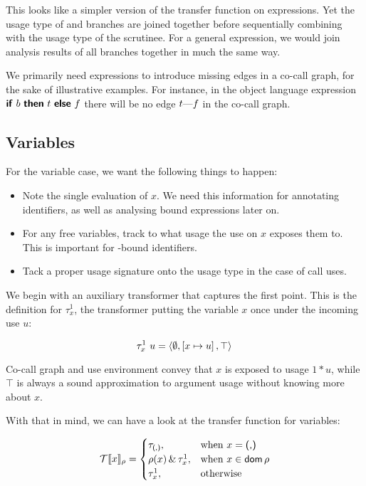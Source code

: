 This looks like a simpler version of the transfer function on  expressions.
Yet the usage type of  and  branches are joined together before sequentially combining with the usage type of the scrutinee.
For a general  expression, we would join analysis results of all branches together in much the same way.

We primarily need  expressions to introduce missing edges in a co-call graph, for the sake of illustrative examples. 
For instance, in the object language expression $\text{\textsf{\textbf{if}}}~b~\text{\textsf{\textbf{then}}}~{t}~\text{\textsf{\textbf{else}}}~{f}$ there will be no edge $t\text{---}f$ in the co-call graph.

\subsection{Variables}\label{sec:var}

For the variable case, we want the following things to happen:

\begin{itemize}
\item Note the single evaluation of $x$. We need this information for annotating identifiers, as well as analysing bound expressions later on.
\item For any free variables, track to what usage the use on $x$ exposes them to. This is important for -bound identifiers.
\item Tack a proper usage signature onto the usage type in the case of call uses.
\end{itemize}

We begin with an auxiliary transformer that captures the first point. 
This is the definition for $\tau^1_x$, the transformer putting the variable $x$ once under the incoming use $u$:

\[
\tau^1_x~u = \left\langle{}\emptyset,\left[x\mapsto u\right],\top\right\rangle{}
\]

Co-call graph and use environment convey that $x$ is exposed to usage $1*u$, while $\top$ is always a sound approximation to argument usage without knowing more about $x$.

With that in mind, we can have a look at the transfer function for variables:

\[
\mathcal{T}\llbracket x\rrbracket_{\rho} =
  \begin{cases}
    \tau_{\text{\textsf{(,)}}}, & \text{when } x = \text{\textsf{(,)}} \\
    \rho(x) \,\&\, \tau^1_x, & \text{when } x\in \mathsf{dom}\,\rho \\
    \tau^1_x, & \text{otherwise}
  \end{cases}
\]

